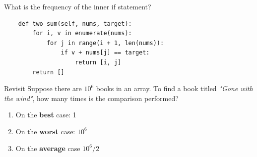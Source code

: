 \documentclass[aspectratio=169, 14pt]{beamer}
\begin{document}
\begin{frame}[fragile]

	{\large {}} What is the frequency of the inner \alert{if} statement?
	\begin{verbatim}
    def two_sum(self, nums, target):
        for i, v in enumerate(nums):
            for j in range(i + 1, len(nums)):
                if v + nums[j] == target:
                    return [i, j]
        return []
    \end{verbatim}


\end{frame}

\begin{frame}[fragile]
	\begin{block}{Revisit}
		Suppose there are $10^6$ books in an array. To find a book titled \emph{"Gone with the wind"}, how many times is the comparison performed?
		\begin{enumerate}
			\item On the \textbf{best} case: 1
			\item On the \textbf{worst} case: $10^6$
			\item On the \textbf{average} case $10^6/2$
		\end{enumerate}
	\end{block}


\end{frame}
\end{document}

